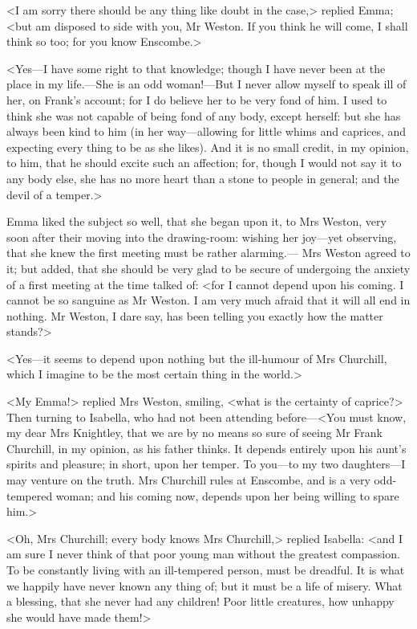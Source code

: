 <I am sorry there should be any thing like doubt in the case,> replied Emma; <but am disposed to side with you, Mr Weston. If you think he will come, I shall think so too; for you know Enscombe.>

<Yes—I have some right to that knowledge; though I have never been at the place in my life.—She is an odd woman!—But I never allow myself to speak ill of her, on Frank's account; for I do believe her to be very fond of him. I used to think she was not capable of being fond of any body, except herself: but she has always been kind to him (in her way—allowing for little whims and caprices, and expecting every thing to be as she likes). And it is no small credit, in my opinion, to him, that he should excite such an affection; for, though I would not say it to any body else, she has no more heart than a stone to people in general; and the devil of a temper.>

Emma liked the subject so well, that she began upon it, to Mrs Weston, very soon after their moving into the drawing-room: wishing her joy—yet observing, that she knew the first meeting must be rather alarming.— Mrs Weston agreed to it; but added, that she should be very glad to be secure of undergoing the anxiety of a first meeting at the time talked of: <for I cannot depend upon his coming. I cannot be so sanguine as Mr Weston. I am very much afraid that it will all end in nothing. Mr Weston, I dare say, has been telling you exactly how the matter stands?>

<Yes—it seems to depend upon nothing but the ill-humour of Mrs Churchill, which I imagine to be the most certain thing in the world.>

<My Emma!> replied Mrs Weston, smiling, <what is the certainty of caprice?> Then turning to Isabella, who had not been attending before—<You must know, my dear Mrs Knightley, that we are by no means so sure of seeing Mr Frank Churchill, in my opinion, as his father thinks. It depends entirely upon his aunt's spirits and pleasure; in short, upon her temper. To you—to my two daughters—I may venture on the truth. Mrs Churchill rules at Enscombe, and is a very odd-tempered woman; and his coming now, depends upon her being willing to spare him.>

<Oh, Mrs Churchill; every body knows Mrs Churchill,> replied Isabella: <and I am sure I never think of that poor young man without the greatest compassion. To be constantly living with an ill-tempered person, must be dreadful. It is what we happily have never known any thing of; but it must be a life of misery. What a blessing, that she never had any children! Poor little creatures, how unhappy she would have made them!>

